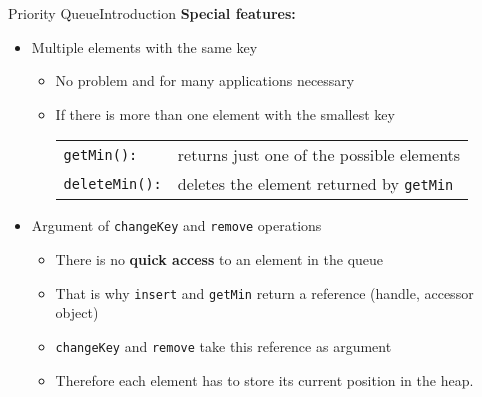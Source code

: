 
\begin{frame}{Priority Queue}{Introduction}
  \textbf{Special features:}
  \begin{itemize}
    \item<2->
      Multiple elements with the same key
      \begin{itemize}
        \item<3->
          No problem and for many applications necessary
        \item<3->
          If there is more than one element with the smallest key
          \begin{tabular}{ll}
            {\color{Mittel-Blau}\texttt{getMin():}} &
            returns just one of the possible elements\\
            {\color{Mittel-Blau}\texttt{deleteMin():}} &
            deletes the element returned by
            {\color{Mittel-Blau}\texttt{getMin}}
          \end{tabular}
      \end{itemize}
      \vspace{0.5em}
    \item<4->
      Argument of {\color{Mittel-Blau}\texttt{changeKey}} and
          {\color{Mittel-Blau}\texttt{remove}} operations
      \begin{itemize}
        \item<5->
          There is no \textbf{quick access} to an element in the queue
        \item<5->
          That is why {\color{Mittel-Blau}\texttt{insert}} and
          {\color{Mittel-Blau}\texttt{getMin}} return a reference
          (handle, accessor object)
        \item<5->
          {\color{Mittel-Blau}\texttt{changeKey}} and
          {\color{Mittel-Blau}\texttt{remove}} take this reference as argument
        \item<5->
          Therefore each element has to store its current position in the heap.
      \end{itemize}
  \end{itemize}
\end{frame}



